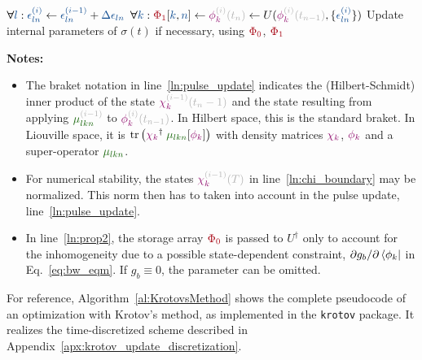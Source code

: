 \documentclass[submission, Phys]{SciPost}
\newcommand{\tr}[0]{\operatorname{tr}}
\newcommand{\VarScalar}[1]{{\color{clVarScalar}#1}}
\newcommand{\VarState}[1]{\ensuremath{\textcolor{clVarState}{#1}}}
\newcommand{\PropAnnotation}[1]{\textcolor{black!30}{#1}}
\newcommand{\VarPropState}[4]{\ensuremath{\VarState{#1}_{\textcolor{clVarState}{#2}}^{\PropAnnotation{#3}}\PropAnnotation{(#4)}}}  %
\newcommand{\VarOperator}[2]{{\color{clVarOperator}#1_{#2}}} %
\newcommand{\VarArray}[1]{{\color{clVarArray}#1}}
\newcommand{\Forall}{\boldsymbol{\forall}}
\begin{document}
\begin{algorithm}
\begin{algorithmic}[1]
         \EndIf
         \State $\Forall \VarScalar{l}: \VarScalar{\epsilon_{ln}^{(i)}} \gets \VarScalar{\epsilon_{ln}^{(i-1)}} + \VarScalar{\Delta \epsilon_{ln}}$ 
         \State $\Forall \VarScalar{k}: \VarArray{\Phi_1}[\VarScalar{k},\VarScalar{n}] \gets \VarPropState{\phi}{k}{(i)}{t_n} \gets U(\VarPropState{\phi}{k}{(i)}{t_{n-1}}, \{\VarScalar{\epsilon_{ln}^{(i)}}\})$  \label{ln:prop3}
      \EndFor
        \State Update internal parameters of $\sigma(t)$ \label{ln:sigma_update} if necessary, using $\VarArray{\Phi_0}$, $\VarArray{\Phi_1}$
      \EndIf
    \EndProcedure
  \end{algorithmic}
\vspace{5pt} \textbf{Notes:}
  \begin{itemize}
  \itemsep0em
    \item The braket notation in line~\ref{ln:pulse_update} indicates the
      (Hilbert-Schmidt) inner product of the state
      $\VarPropState{\chi}{k}{(i-1)}{t_n-1}$ and the state
      resulting from applying $\VarOperator{\mu^{\PropAnnotation{(i-1)}}}{lkn}$
      to $\VarPropState{\phi}{k}{(i)}{t_{n-1}}$.
      In Hilbert space, this is the standard braket.
      In Liouville space, it is $\tr\left(\VarState{\chi_k}^\dagger
      \;\VarOperator{\mu}{lkn}[\VarState{\phi_k}]\right)$ with density
      matrices $\VarState{\chi_k}$, $\VarState{\phi_k}$ and a super-operator
      $\VarOperator{\mu}{lkn}$.
    \item For numerical stability, the states $\VarPropState{\chi}{k}{(i-1)}{T}$
      in line~\ref{ln:chi_boundary} may be normalized. This norm then has to
      taken into account in the pulse update, line~\ref{ln:pulse_update}.
    \item In line~\ref{ln:prop2}, the storage array $\VarArray{\Phi_0}$ is
      passed to $U^\dagger$ only to account for the inhomogeneity due to
      a possible state-dependent constraint, $\partial g_b / \partial
      \bra{\phi_k}$ in Eq.~\eqref{eq:bw_eqm}.
      If $g_b \equiv 0$, the parameter can be omitted.
  \end{itemize}
\end{algorithm}

For reference, Algorithm~\ref{al:KrotovsMethod} shows the complete pseudocode of
an optimization with Krotov's method, as implemented in the \texttt{krotov}
package.
It realizes the time-discretized scheme described in
Appendix~\ref{apx:krotov_update_discretization}.
\end{document}

